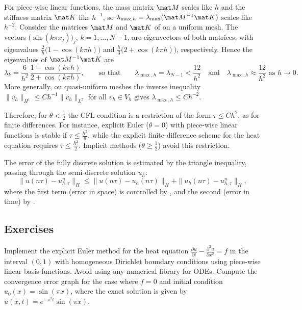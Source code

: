 \begin{remark}
    For piece-wise linear functions, the mass matrix $\mat M$ scales like $h$ and the stiffness matrix $\mat K$ like $h^{-1}$, so $\lambda_{\max,h} = \lambda_{\max}(\mat M^{-1}\mat K)$ scales like $h^{-2}$.
    Consider the matrices $\mat M$ and $\mat K$ of  on a uniform mesh. The vectors $\big(\sin(k\pi x_j)\big)_j$, $k = 1, \dots, N-1$, are eigenvectors of both matrices, with eigenvalues $\frac 2 h \big(1 - \cos(k\pi h)\big)$ and $\frac h 3 \big(2 + \cos(k\pi h)\big)$, respectively. Hence the eigenvalues of $\mat M^{-1}\mat K$ are
    \begin{equation*}
        \lambda_k = \frac{6}{h^2}\, \frac{1 - \cos(k\pi h)}{2 + \cos(k\pi h)},
        \qquad \text{so that} \qquad
        \lambda_{\max,h} = \lambda_{N-1} < \frac{12}{h^2}
        \quad \text{and} \quad
        \lambda_{\max,h} \approx \frac{12}{h^2} \text{ as } h \to 0.
    \end{equation*}
    More generally, on quasi-uniform meshes the inverse inequality $\|v_h\|_{H^1} \le C h^{-1} \|v_h\|_{L^2}$ for all $v_h \in V_h$ gives $\lambda_{\max,h} \le C h^{-2}$.

    Therefore, for $\theta < \frac 12$ the CFL condition is a restriction of the form $\tau \le C h^2$, as for finite differences. For instance, explicit Euler ($\theta = 0$) with piece-wise linear functions is stable if $\tau \le \frac{h^2}{6}$, while the explicit finite-difference scheme for the heat equation requires $\tau \le \frac{h^2}{2}$. Implicit methods ($\theta \ge \frac12$) avoid this restriction.
\end{remark}

\begin{remark}
    The error of the fully discrete solution is estimated by the triangle inequality, passing through the semi-discrete solution $u_h$:
    \begin{equation*}
        \|u(n\tau)-u_{h,\tau}^n\|_H \le \|u(n\tau)-u_h(n\tau)\|_H + \|u_h(n\tau)-u_{h,\tau}^n\|_H,
    \end{equation*}
    where the first term (error in space) is controlled by , and the second (error in time) by .
\end{remark}

\subsection*{Exercises}
\begin{exercises}
    \ex Implement the explicit Euler method for the heat equation $\frac{\partial u}{\partial t} - \frac{\partial^2 u}{\partial x^2} = f$ in the interval $(0,1)$ with homogeneous Dirichlet boundary conditions using piece-wise linear basis functions. Avoid using any numerical library for ODEs.
    Compute the convergence error graph for the case where $f = 0$ and initial condition $u_0(x) = \sin(\pi x)$, where the exact solution is given by $u(x,t) = e^{-\pi^2 t} \sin(\pi x)$.
\end{exercises}
